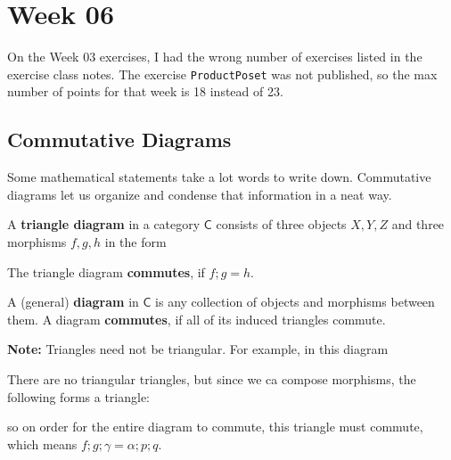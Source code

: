 \section{Week 06}
On the Week 03 exercises, I had the wrong number of exercises listed in the exercise class notes. The exercise \texttt{ProductPoset} was not published, so the max number of points for that week is 18 instead of 23.

\subsection{Commutative Diagrams}
Some mathematical statements take a lot words to write down.
Commutative diagrams let us organize and condense that information in a neat way.

A \textbf{triangle diagram} in a category $\textsf{C}$ consists of three objects $X,Y,Z$ and three morphisms $f,g,h$ in the form
\begin{center}
\end{center}
The triangle diagram \textbf{commutes}, if $f;g = h$.

A (general) \textbf{diagram} in $\textsf{C}$ is any collection of objects and morphisms between them.
A diagram \textbf{commutes}, if all of its induced triangles commute.

\textbf{Note:} Triangles need not be triangular.
For example, in this diagram
\begin{center}
\end{center}
There are no triangular triangles, but since we ca compose morphisms, the following forms a triangle:
\begin{center}
\end{center}
so on order for the entire diagram to commute, this triangle must commute, which means $f;g;\gamma = \alpha;p;q$.

